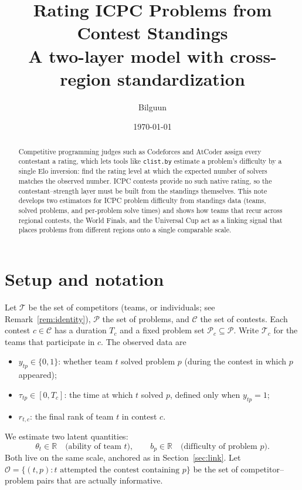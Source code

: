 \documentclass[11pt]{article}
\title{\textbf{Rating ICPC Problems from Contest Standings}\\[2pt]
\large A two-layer model with cross-region standardization}
\author{Bilguun}
\date{\today}
\newcommand{\R}{\mathbb{R}}
\newcommand{\Teams}{\mathcal{T}}
\newcommand{\Probs}{\mathcal{P}}
\newcommand{\Conts}{\mathcal{C}}
\newcommand{\Obs}{\mathcal{O}}
\theoremstyle{definition}
\begin{document}
\maketitle

\begin{abstract}
\noindent
Competitive programming judges such as Codeforces and AtCoder assign every
contestant a rating, which lets tools like \texttt{clist.by} estimate a
problem's difficulty by a single Elo inversion: find the rating level at which
the expected number of solvers matches the observed number. ICPC contests
provide no such native rating, so the contestant--strength layer must be built
from the standings themselves. This note develops two estimators for ICPC
problem difficulty from standings data (teams, solved problems, and per-problem
solve times) and shows how teams that recur across regional contests, the World
Finals, and the Universal Cup act as a linking signal that places problems from
different regions onto a single comparable scale.
\end{abstract}

\section{Setup and notation}\label{sec:setup}

Let $\Teams$ be the set of competitors (teams, or individuals; see
Remark~\ref{rem:identity}), $\Probs$ the set of problems, and $\Conts$ the set
of contests. Each contest $c \in \Conts$ has a duration $T_c$ and a fixed
problem set $\Probs_c \subseteq \Probs$. Write $\Teams_c$ for the teams that
participate in $c$. The observed data are
\begin{itemize}[leftmargin=1.4em,itemsep=2pt]
  \item $y_{tp} \in \{0,1\}$: whether team $t$ solved problem $p$
        (during the contest in which $p$ appeared);
  \item $\tau_{tp} \in [0,T_c]$: the time at which $t$ solved $p$, defined only
        when $y_{tp}=1$;
  \item $r_{t,c}$: the final rank of team $t$ in contest $c$.
\end{itemize}
We estimate two latent quantities:
\[
  \theta_t \in \R \quad\text{(ability of team $t$)},
  \qquad
  b_p \in \R \quad\text{(difficulty of problem $p$)} .
\]
Both live on the same scale, anchored as in Section~\ref{sec:link}.
Let $\Obs = \{(t,p) : t \text{ attempted the contest containing } p\}$ be the
set of competitor--problem pairs that are actually informative.
\end{document}
